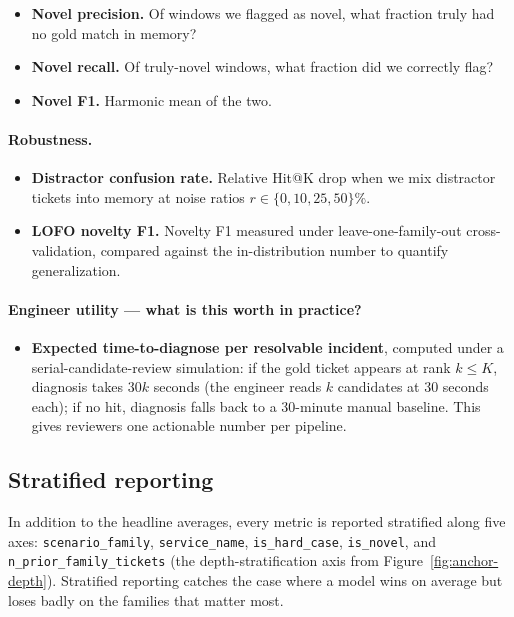 \begin{itemize}
\item \textbf{Novel precision.} Of windows we flagged as novel, what fraction truly had no gold match in memory?
\item \textbf{Novel recall.} Of truly-novel windows, what fraction did we correctly flag?
\item \textbf{Novel F1.} Harmonic mean of the two.
\end{itemize}

\paragraph{Robustness.}

\begin{itemize}
\item \textbf{Distractor confusion rate.} Relative Hit@K drop when we mix distractor tickets into memory at noise ratios $r \in \{0, 10, 25, 50\}\%$.
\item \textbf{LOFO novelty F1.} Novelty F1 measured under leave-one-family-out cross-validation, compared against the in-distribution number to quantify generalization.
\end{itemize}

\paragraph{Engineer utility --- what is this worth in practice?}

\begin{itemize}
\item \textbf{Expected time-to-diagnose per resolvable incident}, computed under a serial-candidate-review simulation: if the gold ticket appears at rank $k \leq K$, diagnosis takes $30k$ seconds (the engineer reads $k$ candidates at 30 seconds each); if no hit, diagnosis falls back to a 30-minute manual baseline. This gives reviewers one actionable number per pipeline.
\end{itemize}

\subsection{Stratified reporting}

In addition to the headline averages, every metric is reported stratified along five axes: \texttt{scenario\_family}, \texttt{service\_name}, \texttt{is\_hard\_case}, \texttt{is\_novel}, and \texttt{n\_prior\_family\_tickets} (the depth-stratification axis from Figure~\ref{fig:anchor-depth}). Stratified reporting catches the case where a model wins on average but loses badly on the families that matter most.

